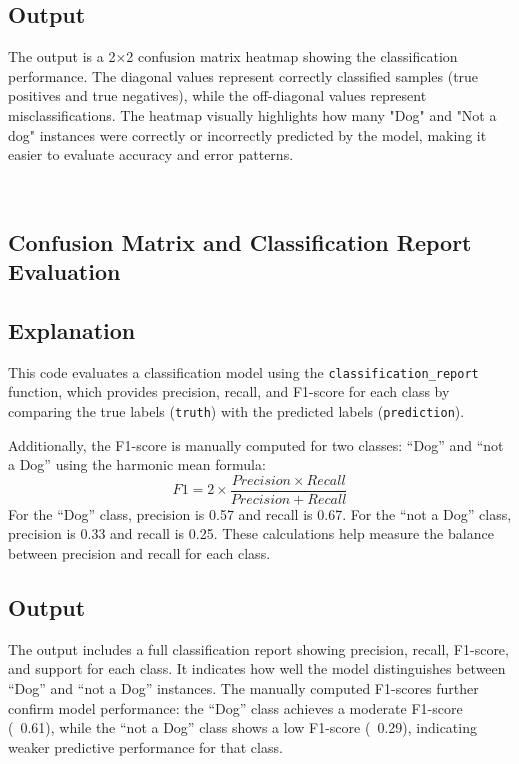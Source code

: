 \documentclass[11pt]{article}
\begin{document}
\subsection*{Output}
The output is a 2×2 confusion matrix heatmap showing the classification performance. The diagonal values represent correctly classified samples (true positives and true negatives), while the off-diagonal values represent misclassifications. The heatmap visually highlights how many "Dog" and "Not a dog" instances were correctly or incorrectly predicted by the model, making it easier to evaluate accuracy and error patterns.

    \begin{center}
    \end{center}
    { \hspace*{\fill} \\}


\subsection{Confusion Matrix and Classification Report Evaluation}

\subsection*{Explanation}
This code evaluates a classification model using the \texttt{classification\_report} function, which provides precision, recall, and F1-score for each class by comparing the true labels (\texttt{truth}) with the predicted labels (\texttt{prediction}). 

Additionally, the F1-score is manually computed for two classes: “Dog” and “not a Dog” using the harmonic mean formula:
\[
F1 = 2 \times \frac{Precision \times Recall}{Precision + Recall}
\]
For the “Dog” class, precision is 0.57 and recall is 0.67. For the “not a Dog” class, precision is 0.33 and recall is 0.25. These calculations help measure the balance between precision and recall for each class.

\subsection*{Output}
The output includes a full classification report showing precision, recall, F1-score, and support for each class. It indicates how well the model distinguishes between “Dog” and “not a Dog” instances. The manually computed F1-scores further confirm model performance: the “Dog” class achieves a moderate F1-score (~0.61), while the “not a Dog” class shows a low F1-score (~0.29), indicating weaker predictive performance for that class.
    
\end{document}
